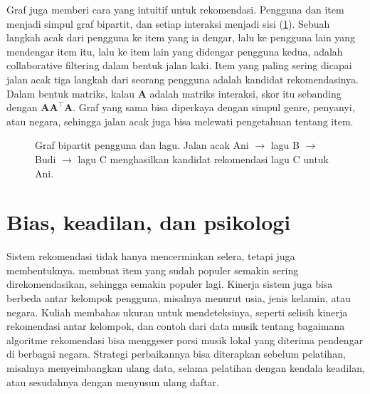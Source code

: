 Graf juga memberi cara yang intuitif untuk rekomendasi. Pengguna dan item menjadi simpul graf bipartit, dan
setiap interaksi menjadi sisi (\cref{fig:bipartit}). Sebuah langkah acak dari pengguna ke item yang ia dengar, lalu ke
pengguna lain yang mendengar item itu, lalu ke item lain yang didengar pengguna kedua, adalah collaborative filtering
dalam bentuk jalan kaki. Item yang paling sering dicapai jalan acak tiga langkah dari seorang pengguna adalah kandidat
rekomendasinya. Dalam bentuk matriks, kalau $\bm A$ adalah matriks interaksi, skor itu sebanding dengan
$\bm A\bm A^\top\bm A$. Graf yang sama bisa diperkaya dengan simpul genre, penyanyi, atau negara, sehingga jalan acak
juga bisa melewati pengetahuan tentang item.

\begin{figure}[ht]
\centering
{}
\caption{Graf bipartit pengguna dan lagu. Jalan acak Ani $\to$ lagu B $\to$ Budi $\to$ lagu C menghasilkan kandidat
rekomendasi lagu C untuk Ani.}
\label{fig:bipartit}
\end{figure}

\section{Bias, keadilan, dan psikologi}

Sistem rekomendasi tidak hanya mencerminkan selera, tetapi juga membentuknya. 
membuat item yang sudah populer semakin sering direkomendasikan, sehingga semakin populer lagi. Kinerja
sistem juga bisa berbeda antar kelompok pengguna, misalnya menurut usia, jenis kelamin, atau negara.
Kuliah membahas ukuran untuk mendeteksinya, seperti selisih kinerja rekomendasi antar kelompok, dan contoh
dari data musik tentang bagaimana algoritme rekomendasi bisa menggeser porsi musik lokal yang diterima
pendengar di berbagai negara. Strategi perbaikannya bisa diterapkan sebelum pelatihan, misalnya
menyeimbangkan ulang data, selama pelatihan dengan kendala keadilan, atau sesudahnya dengan menyusun
ulang daftar.

